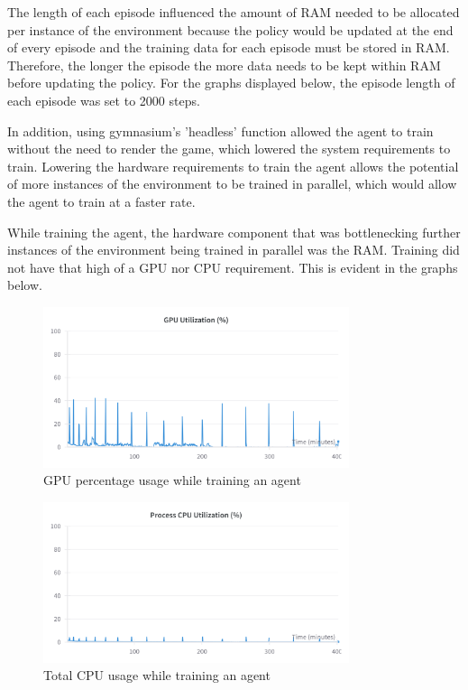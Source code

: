 The length of each episode influenced the amount of RAM needed to be allocated per instance of the environment because the policy would be updated at the end of every episode and the training data for each episode must be stored in RAM. Therefore, the longer the episode the more data needs to be kept within RAM before updating the policy. For the graphs displayed below, the episode length of each episode was set to 2000 steps. %

In addition, using gymnasium's 'headless' function allowed the agent to train without the need to render the game, which lowered the system requirements to train. Lowering the hardware requirements to train the agent allows the potential of more instances of the environment to be trained in parallel, which would allow the agent to train at a faster rate.

While training the agent, the hardware component that was bottlenecking further instances of the environment being trained in parallel was the RAM. Training did not have that high of a GPU nor CPU requirement. This is evident in the graphs below. 

\begin{figure}[H]
    \centering
    \includegraphics[width=0.8\textwidth]{figures/GPU_Utilization.png}
    \caption{GPU percentage usage while training an agent}
    \label{fig:gpu_memory_usage}
\end{figure}

\begin{figure}[H]
    \centering
    \includegraphics[width=0.8\textwidth]{figures/total_cpu_utilization.png}
    \caption{Total CPU usage while training an agent}
    \label{fig:ram_usage}
\end{figure}

